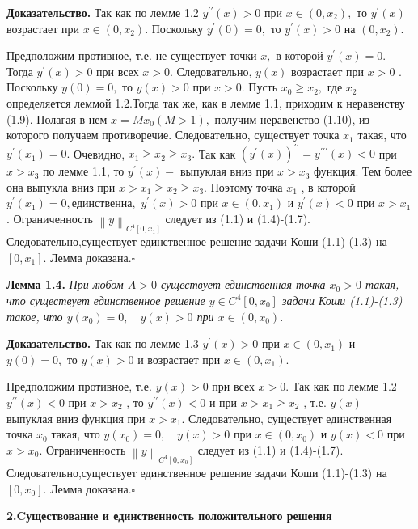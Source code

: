 {\bf  Доказательство.}    Так как по лемме   1.2 $ y^{\prime\prime}(x)>0 $
при $ x \in (0,x_2), $    то $ y^{\prime}(x) $ возрастает при
$ x \in (0,x_2). $ Поскольку $ y^{\prime}(0)=0, $   то  $ y^{\prime}(x)>0 $
на $  (0,x_2). $

Предположим противное, т.е. не существует точки $ x, $
 в которой  $ y^{\prime}(x)=0. $    Тогда $ y^{\prime}(x)>0 $   при всех
$ x>0. $ Следовательно, $ y(x) $ возрастает при $ x>0 $ .  Поскольку $ y(0)=0, $
то $ y(x)>0 $   при $ x>0. $  Пусть $ x_0 \geq x_2, $   где $ x_2 $
определяется леммой 1.2.Тогда  так же, как в лемме 1.1,  приходим к неравенству
(1.9). Полагая в нем $ x=Mx_0(M>1), $ получим неравенство (1.10), из которого
получаем противоречие.  Следовательно, существует точка $ x_1 $   такая,
что $ y^{\prime}(x_1)=0. $  Очевидно, $ x_1\geq x_2 \geq x_3.$  Так как
$ (y^{\prime}(x))^{\prime\prime}=y^{\prime\prime\prime}(x)<0 $ при $ x>x_3 $  по лемме 1.1,
то $ y^{\prime}(x)- $  выпуклая вниз при $ x>x_3 $   функция. Тем более она
выпукла вниз при $ x>x_1\geq x_2 \geq x_3. $ Поэтому  точка $ x_1 $ , в которой
$ y^{\prime}(x_1)=0, единственна, $ \quad $ y^{\prime}(x)>0 $  при
$ x \in (0,x_1) $ и  $ y^{\prime}(x)<0 $    при $ x>x_1 $  .
Ограниченность $ \left\|y\right\|_{C^4[0,x_1]} $
следует из (1.1) и (1.4)-(1.7). Следовательно,существует единственное решение задачи
Коши (1.1)-(1.3) на $ [0,x_1] $.  Лемма доказана.$ \square $

{ \bf Лемма 1.4.} { \it  При любом $ A>0 $   существует единственная точка
$ x_0>0 $ такая, что существует единственное решение $ y \in C^4[0,x_0] $
задачи Коши (1.1)-(1.3) такое, что  $ y(x_0)=0, \quad y(x)>0 $  при $ x \in (0,x_0). $}

{\bf  Доказательство.}  Так как по лемме 1.3 $ y^{\prime}(x)>0 $
при $ x \in (0,x_1) $ и $ y(0)=0,$ то $ y(x)>0 $ и возрастает при $ x \in (0,x_1).$

Предположим противное, т.е. $ y(x)>0 $  при  всех $ x>0.$
 Так как  по лемме 1.2 $ y^{\prime\prime}(x)<0 $ при $ x>x_2 $ ,
то $ y^{\prime\prime}(x)<0 $  и при  $ x>x_1 \geq x_2 $ , т.е. $ y(x)-$  выпуклая вниз
функция при $ x>x_1. $  Следовательно, существует единственная точка $ x_0 $
такая, что $ y(x_0)=0,\quad y(x)>0 $   при $ x \in (0,x_0) $   и $ y(x)<0 $
при $ x>x_0 $.  Ограниченность $ {\left \| y \right \|}_{C^4[0,x_0]} $
следует из (1.1) и (1.4)-(1.7). Следовательно,существует единственное решение задачи
Коши (1.1)-(1.3) на $ [0,x_0] $.  Лемма доказана.$ \square $
\newpage
\centerline {\bf 2.Cуществование и единственность положительного решения}


